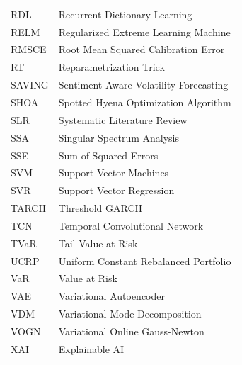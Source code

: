 \begin{table}[H]
\begin{subtable}[t]{0.49\textwidth}
\begin{tabular}{lp{}}
        RDL & Recurrent Dictionary Learning \\
        RELM & Regularized Extreme Learning Machine \\
        RMSCE & Root Mean Squared Calibration Error \\
        RT & Reparametrization Trick \\
        SAVING & Sentiment-Aware Volatility Forecasting \\
        SHOA & Spotted Hyena Optimization Algorithm \\
        SLR & Systematic Literature Review \\
        SSA & Singular Spectrum Analysis \\
        SSE & Sum of Squared Errors \\
        SVM & Support Vector Machines \\
        SVR & Support Vector Regression \\
        TARCH & Threshold GARCH \\
        TCN & Temporal Convolutional Network \\
        TVaR & Tail Value at Risk \\
        UCRP & Uniform Constant Rebalanced Portfolio \\
        VaR & Value at Risk \\
        VAE & Variational Autoencoder \\
        VDM & Variational Mode Decomposition \\
        VOGN & Variational Online Gauss-Newton \\
        XAI & Explainable AI \\
        \bottomrule
        \end{tabular}
    \end{subtable}
\end{table}



